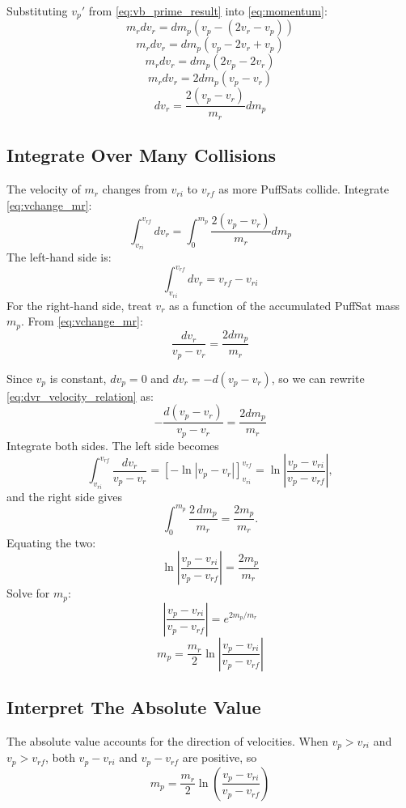 \documentclass{article}
\begin{document}
Substituting \(v_p'\) from \autoref{eq:vb_prime_result} into \autoref{eq:momentum}:
\[
m_r dv_r = dm_p (v_p - (2 v_r - v_p))
\]
\[
m_r dv_r = dm_p (v_p - 2 v_r + v_p)
\]
\[
m_r dv_r = dm_p (2 v_p - 2 v_r)
\]
\[
m_r dv_r = 2 dm_p (v_p - v_r)
\]
\begin{equation}
dv_r = \frac{2 (v_p - v_r)}{m_r} dm_p \label{eq:vchange_mr}
\end{equation}

\subsection{Integrate Over Many Collisions}
The velocity of \( m_r \) changes from \( v_{ri} \) to \( v_{rf} \) as more PuffSats collide. Integrate \autoref{eq:vchange_mr}:
\[
\int_{v_{ri}}^{v_{rf}} dv_r = \int_0^{m_p} \frac{2 (v_p - v_r)}{m_r} dm_p
\]
The left-hand side is:
\[
\int_{v_{ri}}^{v_{rf}} dv_r = v_{rf} - v_{ri}
\]
For the right-hand side, treat \( v_r \) as a function of the accumulated PuffSat mass \( m_p \). From \autoref{eq:vchange_mr}:
\begin{equation}
\frac{dv_r}{v_p - v_r} = \frac{2 dm_p}{m_r}\label{eq:dvr_velocity_relation}
\end{equation}

Since \(v_p\) is constant, \(dv_p = 0\) and \(dv_r = -d(v_p-v_r)\), so we can rewrite \autoref{eq:dvr_velocity_relation} as:
\[
-\frac{d(v_p - v_r)}{v_p - v_r} = \frac{2 dm_p}{m_r}
\]
Integrate both sides. The left side becomes
\[
\int_{v_{ri}}^{v_{rf}} \frac{dv_r}{v_p - v_r}
= \left[ -\ln|v_p - v_r| \right]_{v_{ri}}^{v_{rf}} = \ln \left| \frac{v_p - v_{ri}}{v_p - v_{rf}} \right|,
\]
and the right side gives
\[
\int_0^{m_p} \frac{2\, dm_p}{m_r} = \frac{2 m_p}{m_r}.
\]
Equating the two:
\[
\ln \left| \frac{v_p - v_{ri}}{v_p - v_{rf}} \right| = \frac{2 m_p}{m_r}
\]
Solve for \( m_p \):
\[
\left| \frac{v_p - v_{ri}}{v_p - v_{rf}} \right| = e^{2 m_p / m_r}
\]
\begin{equation}
m_p = \frac{m_r}{2} \ln \left| \frac{v_p - v_{ri}}{v_p - v_{rf}} \right| 
\end{equation}
\subsection{Interpret The Absolute Value} 
The absolute value accounts for the direction of velocities. When \( v_p > v_{ri} \) and \( v_p > v_{rf} \), both \( v_p - v_{ri} \) and \( v_p - v_{rf} \) are positive, so
\[
m_p = \frac{m_r}{2} \ln \left( \frac{v_p - v_{ri}}{v_p - v_{rf}} \right)
\]
\end{document}
